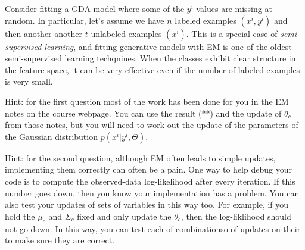 \documentclass{article}
\begin{document}
Consider fitting a GDA model where some of the $y^i$ values are missing at random. In particular, let's assume we have $n$ labeled examples $(x^i,y^i)$ and then another another $t$ unlabeled examples $(x^i)$. This is a special case of \emph{semi-supervised learning}, and fitting generative models with EM is one of the oldest semi-supervised learning techqniues. When the classes exhibit clear structure in the feature space, it can be very effective even if the number of labeled examples is very small.


Hint: for the first question most of the work has been done for you in the EM notes on the course webpage. You can use the result (**) and the update of $\theta_c$ from those notes, but you will need to work out the update of the parameters of the Gaussian distribution $p(x^i | y^i, \Theta)$.

Hint: for the second question, although EM often leads to simple updates, implementing them correctly can often be a pain. One way to help debug your code is to compute the observed-data log-likelihood after every iteration. If this number goes down, then you know your implementation has a problem. You can also test your updates of sets of variables in this way too. For example, if you hold the $\mu_c$ and $\Sigma_c$ fixed and only update the $\theta_c$, then the log-liklihood should not go down. In this way, you can test each of combinationso of updates on their to make sure they are correct.
\end{document}
